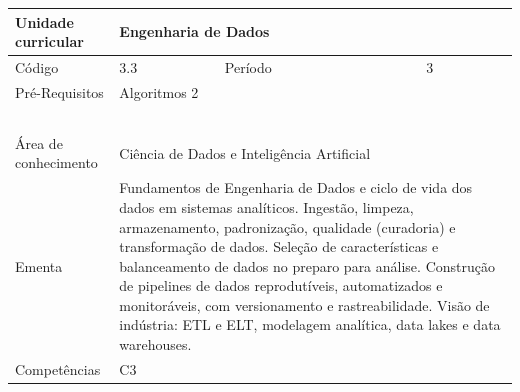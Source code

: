 \clearpage
\newpage

\begin{quadro}[ht!]
  \centering\scriptsize
\caption{Unidade Curricular Engenharia de Dados}

\begin{tabular}{|p{2.5cm}|p{2.5cm}|p{2.5cm}|p{2.5cm}|p{2.5cm}|}\hline

  Unidade curricular & \multicolumn{4}{p{10cm}|}{ Engenharia de Dados }\\\hline
  Código & 3.3 & Período & \multicolumn{2}{p{5cm}|}{ 3 }\\\hline
  Pré-Requisitos & \multicolumn{4}{p{10cm}|}{ Algoritmos 2 } \\\hline
  \cellcolor{blue1}{ CH PRESENCIAL } &
    \cellcolor{blue1}{CH EAD Síncrona} &
    \cellcolor{blue1}{CH EAD Síncrona Mediada} &
    \cellcolor{blue1}{CH EAD Assíncrona} &
    \cellcolor{blue1}{CH APCC} \\\hline
  \cellcolor{blue1}{ 60 } &
    \cellcolor{blue1}{ 0 } &
    \cellcolor{blue1}{ 0 } &
    \cellcolor{blue1}{ 0 } &
    \cellcolor{blue1}{0} \\\hline
  \cellcolor{blue1}{ CH Teórica } &
    \cellcolor{blue1}{CH Prática} &
    \cellcolor{blue1}{CH Humanidades} &
    \cellcolor{blue1}{CH Extensão} &
    \cellcolor{blue1}{CH EAD TOTAL} \\\hline
  \cellcolor{blue1}{ 30 } &
    \cellcolor{blue1}{ 30 } &
    \cellcolor{blue1}{ 0 } &
    \cellcolor{blue1}{ 0 } &
    \cellcolor{blue1}{ 0 } \\\hline
  \cellcolor{blue1}{CARGA-HORÁRIA TOTAL} & \multicolumn{4}{p{10cm}|}{ \cellcolor{blue1}{ 60 } } \\\hline
  Área de conhecimento & \multicolumn{4}{p{10cm}|}{ Ciência de Dados e Inteligência Artificial } \\\hline
  Ementa & \multicolumn{4}{p{10cm}|}{ Fundamentos de Engenharia de Dados e ciclo de vida dos dados em sistemas analíticos. Ingestão, limpeza, armazenamento, padronização, qualidade (curadoria) e transformação de dados. Seleção de características e balanceamento de dados no preparo para análise. Construção de pipelines de dados reprodutíveis, automatizados e monitoráveis, com versionamento e rastreabilidade. Visão de indústria: ETL e ELT, modelagem analítica, data lakes e data warehouses. } \\\hline
  Competências & \multicolumn{4}{p{10cm}|}{ C3 } \\\hline


  
	\end{tabular}

\end{quadro}


